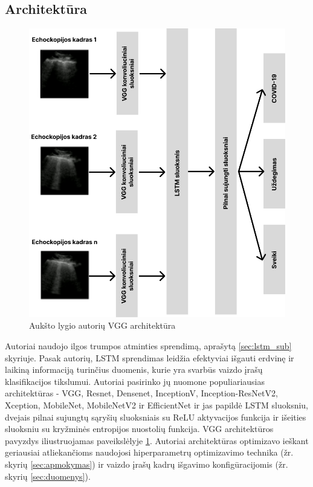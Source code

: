 \documentclass[fleqn]{VUMIFKompMagistrinis}
\begin{document}
\subsection{Architektūra}
\begin{figure}[H]
    \centering
    \includegraphics[scale=0.33]{img/lstm.png}
    \caption{Aukšto lygio autorių VGG architektūra \cite{LSTM}}
    \label{img:lstmvgg}
\end{figure}
Autoriai naudojo ilgos trumpos atminties sprendimą, aprašytą \ref{sec:lstm_sub} skyriuje. Pasak autorių, LSTM sprendimas leidžia efektyviai išgauti erdvinę ir laikiną informaciją turinčius duomenis, kurie yra svarbūs vaizdo įrašų klasifikacijos tikslumui. Autoriai pasirinko jų nuomone populiariausias architektūras - VGG, Resnet, Densenet, InceptionV, Inception-ResNetV2, Xception, MobileNet, MobileNetV2 ir EfficientNet ir jas papildė LSTM sluoksniu, dvejais pilnai sujungtų sąryšių sluoksniais su ReLU aktyvacijos funkcija ir išeities sluoksniu su kryžminės entropijos nuostolių funkcija. VGG architektūros pavyzdys iliustruojamas paveikslėlyje \ref{img:lstmvgg}. Autoriai architektūras optimizavo ieškant geriausiai atliekančioms naudojosi hiperparametrų optimizavimo technika (žr. skyrių \ref{sec:apmokymas}) ir vaizdo įrašų kadrų išgavimo konfigūracijomis (žr. skyrių \ref{sec:duomenys}). \cite{LSTM} 
\end{document}
